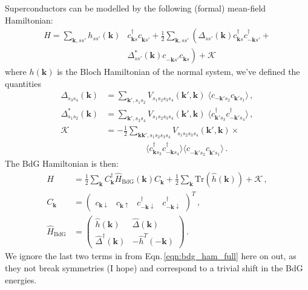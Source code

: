 \documentclass[aps,prb,twocolumn,superscriptaddress,nofootinbib]{revtex4-2}
\newcommand{\bk}{\bm{k}}
\begin{document}
Superconductors can be modelled by the following (formal) mean-field Hamiltonian:
\begin{align} \label{eqn:H_mf}
    H = \sum_{\bk, ss'} h_{ss'} (\bk) & c^{\dagger}_{\bk s} c^{\phantom{\dagger}}_{\bk s'}
    + \frac{1}{2} \sum_{\bk, s s'}
    \left(
    \Delta^{\phantom{*}}_{s s'} (\bk)  c^{\dagger}_{\bk s} c^{\dagger}_{-\bk s'} \nonumber +  \right.\\
    & \left. \Delta^{*}_{s s'} (\bk) c^{\phantom{\dagger}}_{-\bk s'} c^{\phantom{\dagger}}_{\bk s} \right)
    + \mathcal{K}
\end{align}
where $h(\bk)$ is the Bloch Hamiltonian of the normal system, we've defined the quantities
\begin{align}
    \Delta_{s_3 s_4} (\bk) &= \sum_{\bk', s_1 s_2}
    V_{s_1 s_2 s_3 s_4} (\bk', \bk) \; \langle c_{-\bk' s_2} c_{\bk' s_1} \rangle \, , \label{eqn:sc_order_param} \\
    \Delta_{s_1 s_2}^{*} (\bk) &= \sum_{\bk', s_3 s_4}
    V_{s_1 s_2 s_3 s_4} (\bk', \bk) \; \langle c^{\dagger}_{\bk' s_3} c^{\dagger}_{-\bk' s_4} \rangle \, , \\
    \mathcal{K} &= - \frac{1}{2} \sum_{\bk \bk', s_1 s_2 s_3 s_4} V_{s_1 s_2 s_3 s_4} (\bk', \bk) \times \nonumber \\
    & \hspace{2cm} \langle c^{\dagger}_{\bk s_3} c^{\dagger}_{-\bk s_4} \rangle \langle c^{\phantom{\dagger}}_{-\bk' s_2} c^{\phantom{\dagger}}_{\bk' s_1} \rangle \, .
\end{align}
The BdG Hamiltonian is then:
\begin{align}
    H &= \frac{1}{2} \sum_{\bk} C^{\dagger}_{\bk} \hat{H}_{\text{BdG}} (\bk) C^{\phantom{\dagger}}_{\bk}
    + \frac{1}{2} \sum_{\bk} \text{Tr} (\hat{h} (\bk)) + \mathcal{K} \, , \label{eqn:bdg_ham_full}\\
    C_{\bk} &= \begin{pmatrix} c_{\bk \downarrow} & c_{\bk \uparrow} &
        c^{\dagger}_{-\bk \downarrow} & c^{\dagger}_{-\bk \downarrow} \end{pmatrix}^T  \, , \\
    \hat{H}_{\text{BdG}} &= \begin{pmatrix} \hat{h} (\bk) & \hat{\Delta} (\bk) \\
        \hat{\Delta}^\dagger (\bk) & - \hat{h}^T (-\bk) \end{pmatrix} \, . \label{eqn:h_bdg}
\end{align}
We ignore the last two terms in from Eqn.\,\eqref{eqn:bdg_ham_full} here on out, as they not break symmetries (I hope) and correspond to a trivial shift in the BdG energies.
\end{document}
